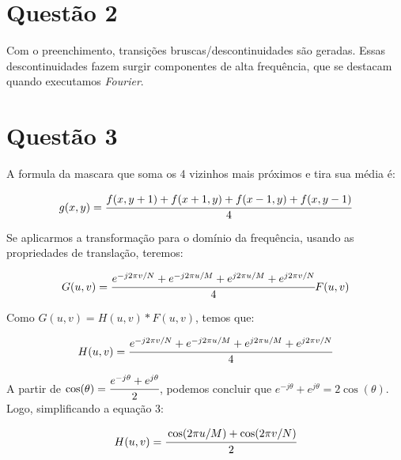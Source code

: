 \documentclass[a4paper,11pt]{article}
\begin{document}
	\section*{Questão 2}
		
	\qquad Com o preenchimento, transições bruscas/descontinuidades são geradas. Essas descontinuidades fazem surgir componentes de alta frequência, que se destacam quando executamos \textit{Fourier}.

	\section*{Questão 3}
	
	\qquad A formula da mascara que soma os 4 vizinhos mais próximos e tira sua média é:
	
	\begin{equation}
	g(x,y) = \cfrac{f(x,y+1) + f(x+1,y) + f(x-1,y) + f(x,y-1) }{4}
	\end{equation}
	
	Se aplicarmos a transformação para o domínio da frequência, usando as propriedades de translação, teremos:
	
	\begin{equation}
	G(u,v) = \cfrac{e^{-j2\pi v/N} + e^{-j2\pi u/M} + e^{j2\pi u/M} + e^{j2\pi v/N}}{4} F(u,v)
	\end{equation}
	
	Como $G(u,v) = H(u,v)*F(u,v) $, temos que:
	
	\begin{equation}
	H(u,v) = \cfrac{e^{-j2\pi v/N} + e^{-j2\pi u/M} + e^{j2\pi u/M} + e^{j2\pi v/N}}{4} 
	\end{equation}
	
	A partir de $\cos(\theta) = \cfrac{e^{-j\theta} + e^{j\theta}}{2} $, podemos concluir que $ e^{-j\theta} + e^{j\theta} = 2\cos(\theta) $. Logo, simplificando a equação 3:
	
	\begin{equation}
	H(u,v) = \cfrac{\cos(2\pi u/M) + \cos(2\pi v/N)}{2}
	\end{equation} 
	
\end{document}
